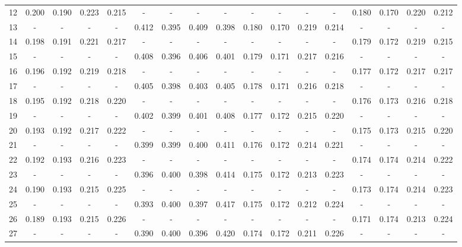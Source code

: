 \documentclass{report}
\begin{document}
\begin{appendices}
\begin{table}
\begin{tabular}{|c|cccc|cccc|cccc|cccc|}
12 & 0.200 & 0.190 & 0.223 & 0.215 &   -   &   -   &   -   &   -   &   -   &   -   &   -   &   -   & 0.180 & 0.170 & 0.220 & 0.212\\
13 &   -   &   -   &   -   &   -   & 0.412 & 0.395 & 0.409 & 0.398 & 0.180 & 0.170 & 0.219 & 0.214 &   -   &   -   &   -   &   -  \\
14 & 0.198 & 0.191 & 0.221 & 0.217 &   -   &   -   &   -   &   -   &   -   &   -   &   -   &   -   & 0.179 & 0.172 & 0.219 & 0.215\\
15 &   -   &   -   &   -   &   -   & 0.408 & 0.396 & 0.406 & 0.401 & 0.179 & 0.171 & 0.217 & 0.216 &   -   &   -   &   -   &   -  \\
16 & 0.196 & 0.192 & 0.219 & 0.218 &   -   &   -   &   -   &   -   &   -   &   -   &   -   &   -   & 0.177 & 0.172 & 0.217 & 0.217\\
17 &   -   &   -   &   -   &   -   & 0.405 & 0.398 & 0.403 & 0.405 & 0.178 & 0.171 & 0.216 & 0.218 &   -   &   -   &   -   &   -  \\
18 & 0.195 & 0.192 & 0.218 & 0.220 &   -   &   -   &   -   &   -   &   -   &   -   &   -   &   -   & 0.176 & 0.173 & 0.216 & 0.218\\
19 &   -   &   -   &   -   &   -   & 0.402 & 0.399 & 0.401 & 0.408 & 0.177 & 0.172 & 0.215 & 0.220 &   -   &   -   &   -   &   -  \\
20 & 0.193 & 0.192 & 0.217 & 0.222 &   -   &   -   &   -   &   -   &   -   &   -   &   -   &   -   & 0.175 & 0.173 & 0.215 & 0.220\\
21 &   -   &   -   &   -   &   -   & 0.399 & 0.399 & 0.400 & 0.411 & 0.176 & 0.172 & 0.214 & 0.221 &   -   &   -   &   -   &   -  \\
22 & 0.192 & 0.193 & 0.216 & 0.223 &   -   &   -   &   -   &   -   &   -   &   -   &   -   &   -   & 0.174 & 0.174 & 0.214 & 0.222\\
23 &   -   &   -   &   -   &   -   & 0.396 & 0.400 & 0.398 & 0.414 & 0.175 & 0.172 & 0.213 & 0.223 &   -   &   -   &   -   &   -  \\
24 & 0.190 & 0.193 & 0.215 & 0.225 &   -   &   -   &   -   &   -   &   -   &   -   &   -   &   -   & 0.173 & 0.174 & 0.214 & 0.223\\
25 &   -   &   -   &   -   &   -   & 0.393 & 0.400 & 0.397 & 0.417 & 0.175 & 0.172 & 0.212 & 0.224 &   -   &   -   &   -   &   -  \\
26 & 0.189 & 0.193 & 0.215 & 0.226 &   -   &   -   &   -   &   -   &   -   &   -   &   -   &   -   & 0.171 & 0.174 & 0.213 & 0.224\\
27 &   -   &   -   &   -   &   -   & 0.390 & 0.400 & 0.396 & 0.420 & 0.174 & 0.172 & 0.211 & 0.226 &   -   &   -   &   -   &   -  \\

\end{tabular}
\end{table}
\end{appendices}
\end{document}

